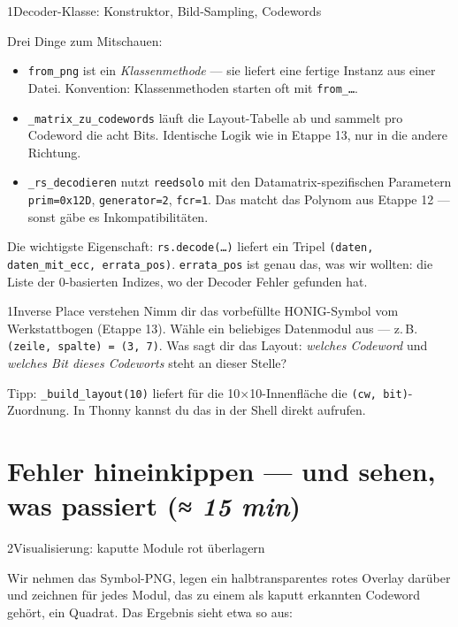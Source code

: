 \begin{pythoneinheit}{1}{Decoder-Klasse: Konstruktor, Bild-Sampling, Codewords}

Drei Dinge zum Mitschauen:

\begin{itemize}
\item \texttt{from\_png} ist ein \emph{Klassenmethode} — sie liefert
  eine fertige Instanz aus einer Datei. Konvention: Klassenmethoden
  starten oft mit \texttt{from\_\dots}.
\item \texttt{\_matrix\_zu\_codewords} läuft die Layout-Tabelle ab
  und sammelt pro Codeword die acht Bits. Identische Logik wie in
  Etappe 13, nur in die andere Richtung.
\item \texttt{\_rs\_decodieren} nutzt \texttt{reedsolo} mit den
  Datamatrix-spezifischen Parametern \texttt{prim=0x12D},
  \texttt{generator=2}, \texttt{fcr=1}. Das matcht das Polynom aus
  Etappe 12 — sonst gäbe es Inkompatibilitäten.
\end{itemize}

Die wichtigste Eigenschaft: \texttt{rs.decode(\dots)} liefert ein
Tripel \texttt{(daten, daten\_mit\_ecc, errata\_pos)}. \texttt{errata\_pos}
ist genau das, was wir wollten: die Liste der 0-basierten Indizes,
wo der Decoder Fehler gefunden hat.
\end{pythoneinheit}

\begin{bleistiftuebung}{1}{Inverse Place verstehen}
Nimm dir das vorbefüllte HONIG-Symbol vom Werkstattbogen (Etappe 13).
Wähle ein beliebiges Datenmodul aus — z.\,B. \texttt{(zeile, spalte)
= (3, 7)}. Was sagt dir das Layout: \emph{welches Codeword} und
\emph{welches Bit dieses Codeworts} steht an dieser Stelle?

Tipp: \texttt{\_build\_layout(10)} liefert für die 10$\times$10-Innen­fläche
die \texttt{(cw, bit)}-Zuordnung. In Thonny kannst du das in der
Shell direkt aufrufen.
\end{bleistiftuebung}

\section{Fehler hineinkippen — und sehen, was passiert \normalfont(\textit{≈ 15 min})}

\begin{pythoneinheit}{2}{Visualisierung: kaputte Module rot überlagern}

Wir nehmen das Symbol-PNG, legen ein halbtransparentes rotes Overlay
darüber und zeichnen für jedes Modul, das zu einem als kaputt
erkannten Codeword gehört, ein Quadrat. Das Ergebnis sieht etwa so
aus:
\end{pythoneinheit}

